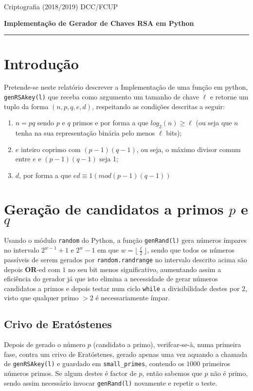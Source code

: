 \documentclass[dvipsnames]{article}
\begin{document}
\noindent Criptografia (2018/2019)
\hfill DCC/FCUP

\begin{center}\LARGE\bf 
  Implementação de Gerador de Chaves RSA em Python \\
\end{center}

\vskip 0.4cm
\hrule
\vskip 0.4cm

\section{Introdução}
Pretende-se neste relatório descrever a Implementação de uma função em python, \texttt{genRSAkey(l)} que receba como argumento um tamanho de chave $\ell$ e retorne um tuplo da forma $(n,p,q,e,d)$, respeitando as condições descritas a seguir:
\begin{enumerate}
  \item $n=pq$ sendo $p$ e $q$ primos e por forma a que $log_2(n) \geq \ell$ (ou seja que $n$ tenha na sua representação binária pelo menos $\ell$ bits);
  \item $e$ inteiro coprimo com $(p-1)(q-1)$, ou seja, o máximo divisor comum entre $e$ e $(p-1)(q-1)$ seja 1;
  \item $d$, por forma a que $ed \equiv 1 (mod (p-1)(q-1))$
\end{enumerate}

\section{Geração de candidatos a primos $p$ e $q$}
Usando o módulo \texttt{random} do Python, a função \texttt{genRand(l)} gera números ímpares no intervalo $2^{w-1} + 1$ e $2^{w} - 1$ em que $w=\lfloor \frac{\ell}{2} \rfloor$, sendo que todos os números passíveis de serem gerados por \texttt{random.randrange} no intervalo descrito acima são depois \textbf{OR}-ed com $1$ no seu bit menos significativo, aumentando assim a eficiência do gerador já que isto elimina a necessidade de gerar números candidatos a primos e depois testar num ciclo \texttt{while} a divisibilidade destes por $2$, visto que qualquer primo $>2$ é necessariamente ímpar.

\vskip 0.4cm

\subsection{Crivo de Eratóstenes}

Depois de gerado o número $p$ (candidato a primo), verifcar-se-à, numa primeira fase, contra um crivo de Eratóstenes, gerado apenas uma vez aquando a chamada de \texttt{genRSAkey(l)} e guardado em \texttt{small\_primes}, contendo os $1000$ primeiros números primos. Se algum destes é factor de $p$, então sabemos que $p$ não é primo, sendo assim necessário invocar \texttt{genRand(l)} novamente e repetir o teste.
\end{document}

